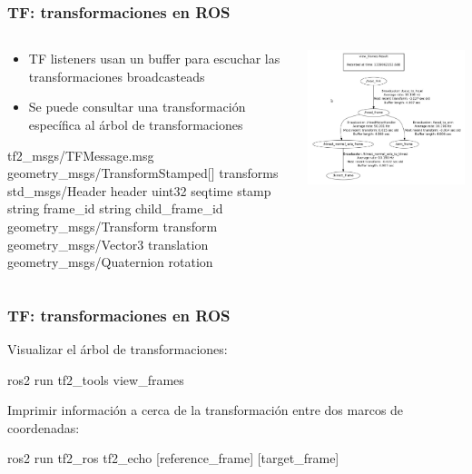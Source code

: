 \begin{frame}
    \frametitle{TF: transformaciones en ROS}
    
        \begin{columns}
    	\begin{column}{0.5\textwidth}
		    \begin{itemize}
				\item TF listeners usan un buffer para escuchar las transformaciones broadcasteads
				\item Se puede consultar una transformación específica al árbol de transformaciones
			\end{itemize}

			tf2\_msgs/TFMessage.msg
			geometry\_msgs/TransformStamped[] transforms
			std\_msgs/Header header
			uint32 seqtime stamp
			string frame\_id
			string child\_frame\_id
			geometry\_msgs/Transform transform
			geometry\_msgs/Vector3 translation
			geometry\_msgs/Quaternion rotation
    	\end{column}
    	\begin{column}{0.5\textwidth}
    		\includegraphics[width=\columnwidth]{images/tf2_tree_graph.png}
    	\end{column}
    \end{columns}
\end{frame}

\begin{frame}
    \frametitle{TF: transformaciones en ROS}
    
    Visualizar el árbol de transformaciones:
    
    ros2 run tf2\_tools view\_frames
    
    Imprimir información a cerca de la transformación entre dos marcos de coordenadas:
    
    ros2 run tf2\_ros tf2\_echo [reference\_frame] [target\_frame]
   
\end{frame}

